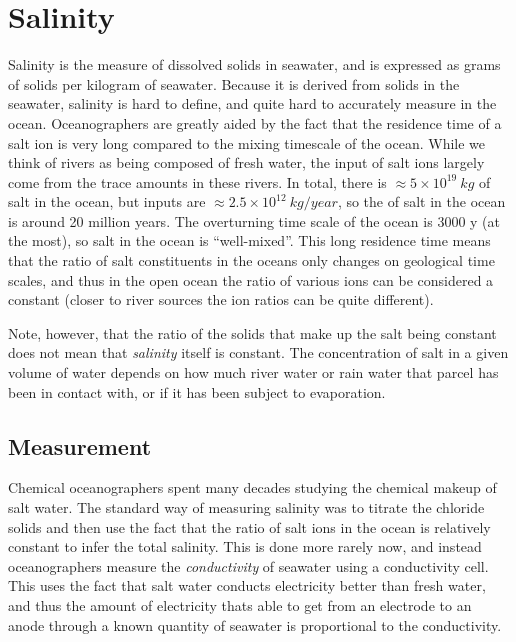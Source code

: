 \section{Salinity}

Salinity is the measure of dissolved solids in seawater, and is expressed as grams of solids per kilogram of seawater.  Because it is derived from solids in the seawater, salinity is hard to define, and quite hard to accurately measure in the ocean. Oceanographers are greatly aided by the fact that the residence time of a salt ion is very long compared to the mixing timescale of the ocean.  While we think of rivers as being composed of fresh water, the input of salt ions largely come from the trace amounts in these rivers. In total, there is $\approx 5 \times  10^{19}\ kg$ of salt in the ocean, but inputs are $\approx 2.5 \times  10^{12}\ kg/year$, so the \emph{} of salt in the ocean is around 20 million years.  The overturning time scale of the ocean is 3000 y (at the most), so salt in the ocean is ``well-mixed''. This long residence time means that the ratio of salt constituents in the oceans only changes on geological time scales, and thus in the open ocean the ratio of various ions can be considered a constant (closer to river sources the ion ratios can be quite different).  

Note, however, that the ratio of the solids that make up the salt being constant does not mean that \emph{salinity} itself is constant.  The concentration of salt in a given volume of water depends on how much river water or rain water that parcel has been in contact with, or if it has been subject to evaporation.  

\subsection{Measurement}

Chemical oceanographers spent many decades studying the chemical makeup of salt water.  The standard way of measuring salinity was to titrate the chloride solids and then use the fact that the ratio of salt ions in the ocean is relatively constant to infer the total salinity.  This is done more rarely now, and instead oceanographers measure the \emph{conductivity} of  seawater using a conductivity cell. This uses the fact that salt water conducts electricity better than fresh water, and thus the amount of electricity thats able to get from an electrode to an anode through a known quantity of seawater is proportional to the conductivity. 

